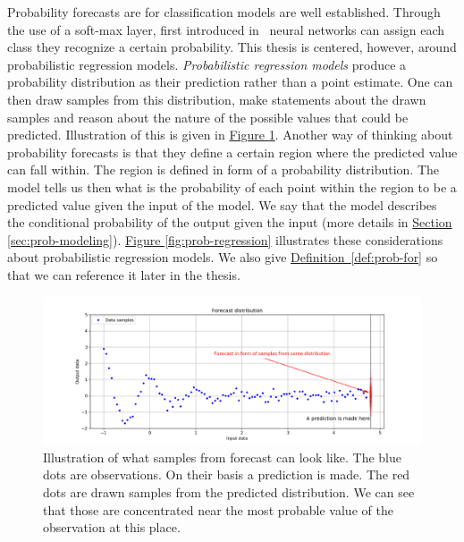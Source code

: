 \documentclass[12pt,a4paper,twoside]{scrartcl}
\numberwithin{equation}{section}
\newcommand{\refdef}[1]{\hyperref[#1]{Definition~\ref*{#1}}}
\newcommand{\reffig}[1]{\hyperref[#1]{Figure \ref*{#1}}}
\newcommand{\refsec}[1]{\hyperref[#1]{Section \ref*{#1}}}
\begin{document}
Probability forecasts are for classification models are well established. Through the use of a soft-max layer, first introduced in~\cite{denker1990} neural networks can assign each class they recognize a certain probability. This thesis is centered, however, around probabilistic regression models. \emph{Probabilistic regression models} produce a probability distribution as their prediction rather than a point estimate. One can then draw samples from this distribution, make statements about the drawn samples and reason about the nature of the possible values that could be predicted. Illustration of this is given in \reffig{fig:pred-dist-draws}. Another way of thinking about probability forecasts is that they define a certain region where the predicted value can fall within. The region is defined in form of a probability distribution. The model tells us then what is the probability of each point within the region to be a predicted value given the input of the model. We say that the model describes the conditional probability of the output given the input (more details in \refsec{sec:prob-modeling}). \reffig{fig:prob-regression} illustrates these considerations about probabilistic regression models. We also give \refdef{def:prob-for} so that we can reference it later in the thesis.
\begin{center}
  \begin{figure}[H]
    \centering
    \includegraphics[height=0.5\textwidth, width=1.0\textwidth]{figures/forecast.png}
    \caption[Forecast sample draws]{Illustration of what samples from forecast can look like. The blue dots are observations. On their basis a prediction is made. The red dots are drawn samples from the predicted distribution. We can see that those are concentrated near the most probable value of the observation at this place.}\label{fig:pred-dist-draws}
  \end{figure}
\end{center}
\end{document}
